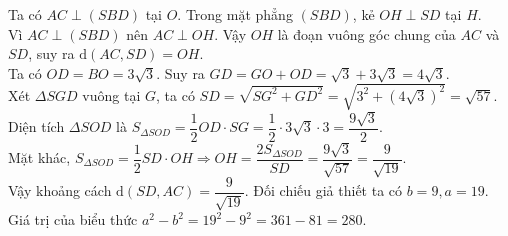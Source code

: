 \begin{ex}
{		\noindent Ta có $AC\perp(SBD)$ tại $O$. Trong mặt phẳng $(SBD)$, kẻ $OH\perp SD$ tại $H$.\\
		Vì $AC\perp(SBD)$ nên $AC\perp OH$. Vậy $OH$ là đoạn vuông góc chung của $AC$ và $SD$, suy ra $\mathrm{d}(AC,SD)=OH$.\\
		Ta có $OD=BO=3\sqrt{3}$. Suy ra $GD=GO+OD=\sqrt{3}+3\sqrt{3}=4\sqrt{3}$.\\
		Xét $\Delta SGD$ vuông tại $G$, ta có $SD=\sqrt{SG^2+GD^2}=\sqrt{3^2+\left(4\sqrt{3}\right)^2}=\sqrt{57}$.\\
		Diện tích $\Delta SOD$ là $S_{\Delta SOD}=\dfrac{1}{2}OD\cdot SG=\dfrac{1}{2}\cdot3\sqrt{3}\cdot3=\dfrac{9\sqrt{3}}{2}$.\\
		Mặt khác, $S_{\Delta SOD}=\dfrac{1}{2}SD\cdot OH\Rightarrow OH=\dfrac{2S_{\Delta SOD}}{SD}=\dfrac{9\sqrt{3}}{\sqrt{57}}=\dfrac{9}{\sqrt{19}}$.\\
		Vậy khoảng cách $\mathrm{d}(SD,AC)=\dfrac{9}{\sqrt{19}}$. Đối chiếu giả thiết ta có $b=9,a=19$.\\
		Giá trị của biểu thức $a^2-b^2=19^2-9^2=361-81=280$.}
\end{ex}
